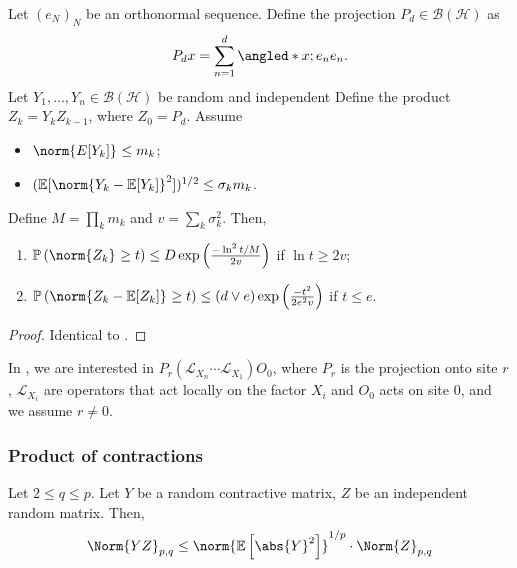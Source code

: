  \begin{corl}
     Let \( (e_N)_N \) be an orthonormal sequence. Define the projection \( P_d\in \mathcal{B}(\mathcal{H}) \) as 
    \[ P_dx = \sum_{n=1}^{d} \angled*{x;e_n}e_n. \]
    Let \( Y_1,\dots,Y_n \in \mathcal{B}(\mathcal{H})\) be random and independent
    Define the product \( Z_k = Y_kZ_{k-1} \), where \( Z_0=P_d \).
    Assume 
    \begin{itemize}
      \item \( \norm{E[Y_k]}_{} \leq m_k \);
      \item \( (\mathbb{E}[\norm{Y_k-\mathbb{E}[Y_k]}_{}^{2}])^{1/2} \leq \sigma_k m_k \).
    \end{itemize}
    Define \( M= \prod_{k}^{}m_k \) and \( v= \sum_{k}^{} \sigma_k^{2} \). Then,
    \begin{enumerate}[1)]
      \item \( \mathbb{P}\left(\norm{Z_k}_{} \geq t\right) \leq D \exp\left(\frac{- \operatorname{ln}^{2}t/M}{2v}\right)\) if \( \operatorname{ln}t \geq 2v \);
      \item \( \mathbb{P}\left( \norm{Z_k- \mathbb{E}[Z_k]}_{} \geq t\right) \leq (d \vee e) \exp\left(\frac{-t^{2}}{2e^{2}v}\right)\) if \( t \leq e \).
    \end{enumerate} 
 \end{corl}
 
 \begin{proof}
   Identical to \cite{huang2020matrix}.
 \end{proof}


\begin{remark}[Application]
  In \cite{chen2021otoc}, we are interested in \( P_r \left(\mathcal{L}_{X_n} \cdots \mathcal{L}_{X_1} \right) O_0\), where \( P_r \) is the projection onto site \( r \), \( \mathcal{L}_{X_i} \) are operators that act locally on the factor \( X_i \) and \( O_0 \) acts on site \( 0 \), and we assume \( r \neq 0 \).
\end{remark}

 
\subsubsection{Product of contractions}

\begin{lem}[]
    Let \( 2 \leq q \leq p\). Let \( Y \) be a random contractive matrix, \( Z \) be an independent random matrix. Then,
    \[ \Norm{YZ}_{p,q} \leq \norm{\mathbb{E}\left[ \abs{Y}^{2}\right]}_{}^{1/p} \cdot \Norm{Z}_{p,q} \]
\end{lem}

